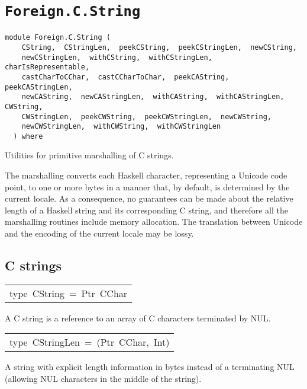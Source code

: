 \chapter{\texttt{Foreign.C.String}}
\label{module:Foreign.C.String}
\haddockbeginheader
{\haddockverb\begin{verbatim}
module Foreign.C.String (
    CString,  CStringLen,  peekCString,  peekCStringLen,  newCString, 
    newCStringLen,  withCString,  withCStringLen,  charIsRepresentable, 
    castCharToCChar,  castCCharToChar,  peekCAString,  peekCAStringLen, 
    newCAString,  newCAStringLen,  withCAString,  withCAStringLen,  CWString, 
    CWStringLen,  peekCWString,  peekCWStringLen,  newCWString, 
    newCWStringLen,  withCWString,  withCWStringLen
  ) where\end{verbatim}}
\haddockendheader

Utilities for primitive marshalling of C strings.
\par
The marshalling converts each Haskell character, representing a Unicode
 code point, to one or more bytes in a manner that, by default, is
 determined by the current locale.  As a consequence, no guarantees
 can be made about the relative length of a Haskell string and its
 corresponding C string, and therefore all the marshalling routines
 include memory allocation.  The translation between Unicode and the
 encoding of the current locale may be lossy.
\par

\section{C strings
}
\begin{haddockdesc}
\item[\begin{tabular}{@{}l}
type\ CString\ =\ Ptr\ CChar
\end{tabular}]\haddockbegindoc
A C string is a reference to an array of C characters terminated by NUL.
\par

\end{haddockdesc}
\begin{haddockdesc}
\item[\begin{tabular}{@{}l}
type\ CStringLen\ =\ (Ptr\ CChar,\ Int)
\end{tabular}]\haddockbegindoc
A string with explicit length information in bytes instead of a
 terminating NUL (allowing NUL characters in the middle of the string).
\par

\end{haddockdesc}
